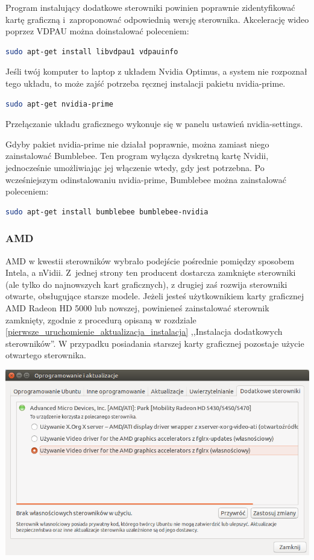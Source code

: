 Program instalujący dodatkowe sterowniki powinien poprawnie zidentyfikować kartę graficzną i~zaproponować odpowiednią wersję sterownika.
Akcelerację wideo poprzez VDPAU można doinstalować poleceniem:

\begin{lstlisting}[language=bash]
sudo apt-get install libvdpau1 vdpauinfo
\end{lstlisting}

Jeśli twój komputer to laptop z układem Nvidia Optimus, a system nie rozpoznał tego układu, to może zajść potrzeba ręcznej instalacji pakietu nvidia-prime. 

\begin{lstlisting}[language=bash]
sudo apt-get nvidia-prime
\end{lstlisting}

\noindent Przełączanie układu graficznego wykonuje się w panelu ustawień \textcolor{ubuntu_orange}{nvidia-settings}.

Gdyby pakiet nvidia-prime nie działał poprawnie, można zamiast niego zainstalować Bumblebee. Ten program wyłącza dyskretną kartę Nvidii, jednocześnie umożliwiając jej włączenie wtedy, gdy jest potrzebna.
Po wcześniejszym odinstalowaniu nvidia-prime, Bumblebee można zainstalować poleceniem:

\begin{lstlisting}[language=bash]
sudo apt-get install bumblebee bumblebee-nvidia
\end{lstlisting}

\subsubsection{AMD}
AMD w kwestii sterowników wybrało podejście pośrednie pomiędzy sposobem Intela, a nVidii. Z~jednej strony ten producent dostarcza zamknięte sterowniki (ale tylko do najnowszych kart graficznych), z drugiej zaś rozwija sterowniki otwarte, obsługujące starsze modele. Jeżeli jesteś użytkownikiem karty graficznej AMD Radeon HD 5000 lub nowszej, powinieneś zainstalować sterownik zamknięty, zgodnie z procedurą opisaną w rozdziale \ref{pierwsze_uruchomienie_aktualizacja_instalacja} ,,Instalacja dodatkowych sterowników''. W przypadku posiadania starszej karty graficznej pozostaje użycie otwartego sterownika.

\begin{center}
	\includegraphics[width=\linewidth]{images/sterowniki_AMD.png}
\end{center}

